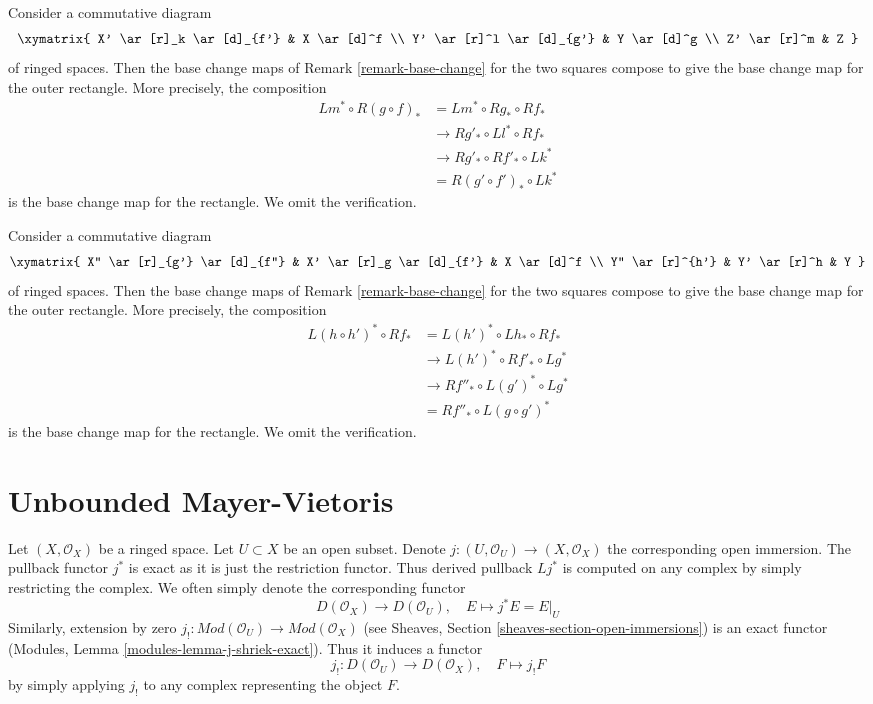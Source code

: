\begin{remark}
\label{remark-compose-base-change}
Consider a commutative diagram
$$
\xymatrix{
X' \ar[r]_k \ar[d]_{f'} & X \ar[d]^f \\
Y' \ar[r]^l \ar[d]_{g'} & Y \ar[d]^g \\
Z' \ar[r]^m & Z
}
$$
of ringed spaces. Then the base change maps of
Remark \ref{remark-base-change}
for the two squares compose to give the base
change map for the outer rectangle. More precisely,
the composition
\begin{align*}
Lm^* \circ R(g \circ f)_*
& =
Lm^* \circ Rg_* \circ Rf_* \\
& \to Rg'_* \circ Ll^* \circ Rf_* \\
& \to Rg'_* \circ Rf'_* \circ Lk^* \\
& = R(g' \circ f')_* \circ Lk^*
\end{align*}
is the base change map for the rectangle. We omit the verification.
\end{remark}

\begin{remark}
\label{remark-compose-base-change-horizontal}
Consider a commutative diagram
$$
\xymatrix{
X'' \ar[r]_{g'} \ar[d]_{f''} & X' \ar[r]_g \ar[d]_{f'} & X \ar[d]^f \\
Y'' \ar[r]^{h'} & Y' \ar[r]^h & Y
}
$$
of ringed spaces. Then the base change maps of
Remark \ref{remark-base-change}
for the two squares compose to give the base
change map for the outer rectangle. More precisely,
the composition
\begin{align*}
L(h \circ h')^* \circ Rf_*
& =
L(h')^* \circ Lh_* \circ Rf_* \\
& \to L(h')^* \circ Rf'_* \circ Lg^* \\
& \to Rf''_* \circ L(g')^* \circ Lg^* \\
& = Rf''_* \circ L(g \circ g')^*
\end{align*}
is the base change map for the rectangle. We omit the verification.
\end{remark}





\section{Unbounded Mayer-Vietoris}
\label{section-unbounded-mayer-vietoris}

\noindent
Let $(X, \mathcal{O}_X)$ be a ringed space. Let $U \subset X$ be an
open subset. Denote $j : (U, \mathcal{O}_U) \to (X, \mathcal{O}_X)$
the corresponding open immersion. The pullback functor $j^*$ is exact
as it is just the restriction functor. Thus derived pullback $Lj^*$ is
computed on any complex by simply restricting the complex. We often
simply denote the corresponding functor
$$
D(\mathcal{O}_X) \to D(\mathcal{O}_U),
\quad
E \mapsto j^*E = E|_U
$$
Similarly, extension by zero
$j_! : \textit{Mod}(\mathcal{O}_U) \to \textit{Mod}(\mathcal{O}_X)$
(see Sheaves, Section \ref{sheaves-section-open-immersions})
is an exact functor (Modules, Lemma \ref{modules-lemma-j-shriek-exact}).
Thus it induces a functor
$$
j_! : D(\mathcal{O}_U) \to D(\mathcal{O}_X),\quad
F \mapsto j_!F
$$
by simply applying $j_!$ to any complex representing the object $F$.

